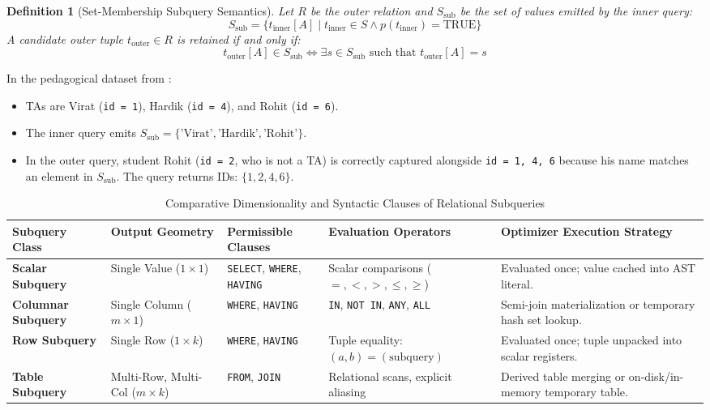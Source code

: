 \documentclass[10pt,twocolumn,letterpaper]{article}
\newtheorem{definition}[theorem]{Definition}
\begin{document}
\begin{definition}[Set-Membership Subquery Semantics]
Let $R$ be the outer relation and $S_{\text{sub}}$ be the set of values emitted by the inner query:
\begin{equation}
S_{\text{sub}} = \{ t_{\text{inner}}[A] \mid t_{\text{inner}} \in S \land p(t_{\text{inner}}) = \text{TRUE} \}
\end{equation}
A candidate outer tuple $t_{\text{outer}} \in R$ is retained if and only if:
\begin{equation}
t_{\text{outer}}[A] \in S_{\text{sub}} \iff \exists s \in S_{\text{sub}} \text{ such that } t_{\text{outer}}[A] = s
\end{equation}
\end{definition}

In the pedagogical dataset from \cite{sql6notes}:
\begin{itemize}
    \item TAs are Virat (\texttt{id = 1}), Hardik (\texttt{id = 4}), and Rohit (\texttt{id = 6}).
    \item The inner query emits $S_{\text{sub}} = \{\text{'Virat'}, \text{'Hardik'}, \text{'Rohit'}\}$.
    \item In the outer query, student Rohit (\texttt{id = 2}, who is not a TA) is correctly captured alongside \texttt{id = 1, 4, 6} because his name matches an element in $S_{\text{sub}}$. The query returns IDs: $\{1, 2, 4, 6\}$.
\end{itemize}

\begin{table}[htbp]
\caption{Comparative Dimensionality and Syntactic Clauses of Relational Subqueries}
\label{tab:dimensionality}
\centering
\scriptsize
\begin{tabular}{p{2.6cm}p{2.2cm}p{2.4cm}p{3.2cm}p{4.6cm}}
\toprule
\textbf{Subquery Class} & \textbf{Output Geometry} & \textbf{Permissible Clauses} & \textbf{Evaluation Operators} & \textbf{Optimizer Execution Strategy} \\
\midrule
\textbf{Scalar Subquery} & Single Value ($1 \times 1$) & \texttt{SELECT}, \texttt{WHERE}, \texttt{HAVING} & Scalar comparisons ($=, <, >, \le, \ge$) & Evaluated once; value cached into AST literal. \\
\textbf{Columnar Subquery} & Single Column ($m \times 1$) & \texttt{WHERE}, \texttt{HAVING} & \texttt{IN}, \texttt{NOT IN}, \texttt{ANY}, \texttt{ALL} & Semi-join materialization or temporary hash set lookup. \\
\textbf{Row Subquery} & Single Row ($1 \times k$) & \texttt{WHERE}, \texttt{HAVING} & Tuple equality: $(a, b) = (\text{subquery})$ & Evaluated once; tuple unpacked into scalar registers. \\
\textbf{Table Subquery} & Multi-Row, Multi-Col ($m \times k$) & \texttt{FROM}, \texttt{JOIN} & Relational scans, explicit aliasing & Derived table merging or on-disk/in-memory temporary table. \\
\bottomrule
\end{tabular}
\end{table}
\end{document}
